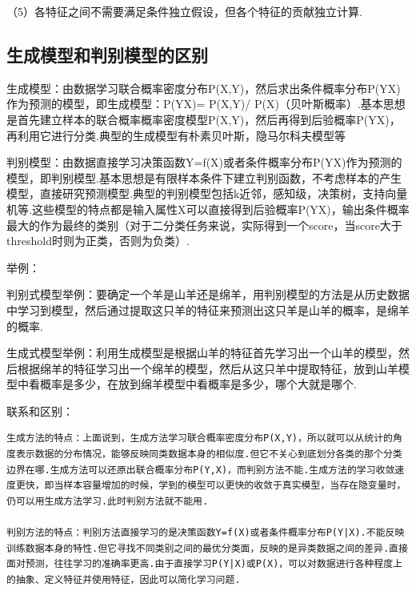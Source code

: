 （5）各特征之间不需要满足条件独立假设，但各个特征的贡献独立计算.

\subsection{生成模型和判别模型的区别}\label{ux751fux6210ux6a21ux578bux548cux5224ux522bux6a21ux578bux7684ux533aux522b}

生成模型：由数据学习联合概率密度分布P(X,Y)，然后求出条件概率分布P(Y\textbar{}X)作为预测的模型，即生成模型：P(Y\textbar{}X)=
P(X,Y)/
P(X)（贝叶斯概率）.基本思想是首先建立样本的联合概率概率密度模型P(X,Y)，然后再得到后验概率P(Y\textbar{}X)，再利用它进行分类.典型的生成模型有朴素贝叶斯，隐马尔科夫模型等

判别模型：由数据直接学习决策函数Y=f(X)或者条件概率分布P(Y\textbar{}X)作为预测的模型，即判别模型.基本思想是有限样本条件下建立判别函数，不考虑样本的产生模型，直接研究预测模型.典型的判别模型包括k近邻，感知级，决策树，支持向量机等.这些模型的特点都是输入属性X可以直接得到后验概率P(Y\textbar{}X)，输出条件概率最大的作为最终的类别（对于二分类任务来说，实际得到一个score，当score大于threshold时则为正类，否则为负类）.

举例：

判别式模型举例：要确定一个羊是山羊还是绵羊，用判别模型的方法是从历史数据中学习到模型，然后通过提取这只羊的特征来预测出这只羊是山羊的概率，是绵羊的概率.

生成式模型举例：利用生成模型是根据山羊的特征首先学习出一个山羊的模型，然后根据绵羊的特征学习出一个绵羊的模型，然后从这只羊中提取特征，放到山羊模型中看概率是多少，在放到绵羊模型中看概率是多少，哪个大就是哪个.

联系和区别：

\begin{verbatim}
生成方法的特点：上面说到，生成方法学习联合概率密度分布P(X,Y)，所以就可以从统计的角度表示数据的分布情况，能够反映同类数据本身的相似度.但它不关心到底划分各类的那个分类边界在哪.生成方法可以还原出联合概率分布P(Y,X)，而判别方法不能.生成方法的学习收敛速度更快，即当样本容量增加的时候，学到的模型可以更快的收敛于真实模型，当存在隐变量时，仍可以用生成方法学习.此时判别方法就不能用.

判别方法的特点：判别方法直接学习的是决策函数Y=f(X)或者条件概率分布P(Y|X).不能反映训练数据本身的特性.但它寻找不同类别之间的最优分类面，反映的是异类数据之间的差异.直接面对预测，往往学习的准确率更高.由于直接学习P(Y|X)或P(X)，可以对数据进行各种程度上的抽象、定义特征并使用特征，因此可以简化学习问题.
\end{verbatim}

